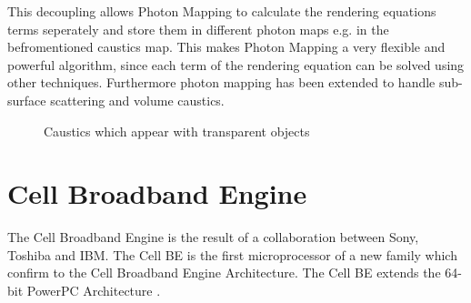 \documentclass[DIV10, abstracton, openright, footsepline, headsepline, twoside, 9pt,
bigheadings]{scrreprt}
\begin{document}
This decoupling allows Photon Mapping to calculate the rendering equations terms
seperately and store them in different photon maps e.g. in the befromentioned  caustics map. This makes Photon Mapping a very flexible and powerful algorithm,
since each term of the rendering equation can be solved using other techniques.
Furthermore photon mapping has been extended to handle sub-surface scattering
and volume caustics.

\begin{figure}[H]
\centering
{}\quad
{}\quad
{}
\caption{Caustics which appear with transparent objects}
\label{fig:caustics}
\end{figure}

\newpage
\section{Cell Broadband Engine}
The Cell Broadband Engine is the result of a collaboration between Sony, Toshiba
and IBM. The Cell BE is the first microprocessor of a new family which confirm
to the Cell Broadband Engine Architecture. The Cell BE extends the 64-bit
PowerPC Architecture \cite{IBMhb06}.
\end{document}
